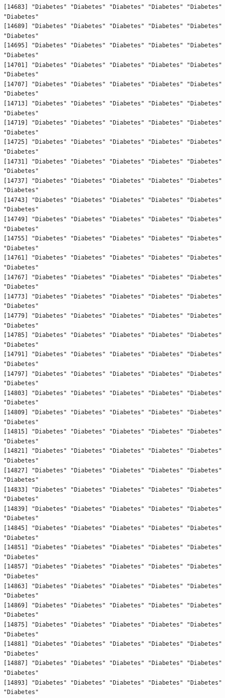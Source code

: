 \documentclass[
  letterpaper,
  DIV=11,
  numbers=noendperiod]{scrartcl}
\begin{document}
\begin{verbatim}
[14683] "Diabetes" "Diabetes" "Diabetes" "Diabetes" "Diabetes" "Diabetes"
[14689] "Diabetes" "Diabetes" "Diabetes" "Diabetes" "Diabetes" "Diabetes"
[14695] "Diabetes" "Diabetes" "Diabetes" "Diabetes" "Diabetes" "Diabetes"
[14701] "Diabetes" "Diabetes" "Diabetes" "Diabetes" "Diabetes" "Diabetes"
[14707] "Diabetes" "Diabetes" "Diabetes" "Diabetes" "Diabetes" "Diabetes"
[14713] "Diabetes" "Diabetes" "Diabetes" "Diabetes" "Diabetes" "Diabetes"
[14719] "Diabetes" "Diabetes" "Diabetes" "Diabetes" "Diabetes" "Diabetes"
[14725] "Diabetes" "Diabetes" "Diabetes" "Diabetes" "Diabetes" "Diabetes"
[14731] "Diabetes" "Diabetes" "Diabetes" "Diabetes" "Diabetes" "Diabetes"
[14737] "Diabetes" "Diabetes" "Diabetes" "Diabetes" "Diabetes" "Diabetes"
[14743] "Diabetes" "Diabetes" "Diabetes" "Diabetes" "Diabetes" "Diabetes"
[14749] "Diabetes" "Diabetes" "Diabetes" "Diabetes" "Diabetes" "Diabetes"
[14755] "Diabetes" "Diabetes" "Diabetes" "Diabetes" "Diabetes" "Diabetes"
[14761] "Diabetes" "Diabetes" "Diabetes" "Diabetes" "Diabetes" "Diabetes"
[14767] "Diabetes" "Diabetes" "Diabetes" "Diabetes" "Diabetes" "Diabetes"
[14773] "Diabetes" "Diabetes" "Diabetes" "Diabetes" "Diabetes" "Diabetes"
[14779] "Diabetes" "Diabetes" "Diabetes" "Diabetes" "Diabetes" "Diabetes"
[14785] "Diabetes" "Diabetes" "Diabetes" "Diabetes" "Diabetes" "Diabetes"
[14791] "Diabetes" "Diabetes" "Diabetes" "Diabetes" "Diabetes" "Diabetes"
[14797] "Diabetes" "Diabetes" "Diabetes" "Diabetes" "Diabetes" "Diabetes"
[14803] "Diabetes" "Diabetes" "Diabetes" "Diabetes" "Diabetes" "Diabetes"
[14809] "Diabetes" "Diabetes" "Diabetes" "Diabetes" "Diabetes" "Diabetes"
[14815] "Diabetes" "Diabetes" "Diabetes" "Diabetes" "Diabetes" "Diabetes"
[14821] "Diabetes" "Diabetes" "Diabetes" "Diabetes" "Diabetes" "Diabetes"
[14827] "Diabetes" "Diabetes" "Diabetes" "Diabetes" "Diabetes" "Diabetes"
[14833] "Diabetes" "Diabetes" "Diabetes" "Diabetes" "Diabetes" "Diabetes"
[14839] "Diabetes" "Diabetes" "Diabetes" "Diabetes" "Diabetes" "Diabetes"
[14845] "Diabetes" "Diabetes" "Diabetes" "Diabetes" "Diabetes" "Diabetes"
[14851] "Diabetes" "Diabetes" "Diabetes" "Diabetes" "Diabetes" "Diabetes"
[14857] "Diabetes" "Diabetes" "Diabetes" "Diabetes" "Diabetes" "Diabetes"
[14863] "Diabetes" "Diabetes" "Diabetes" "Diabetes" "Diabetes" "Diabetes"
[14869] "Diabetes" "Diabetes" "Diabetes" "Diabetes" "Diabetes" "Diabetes"
[14875] "Diabetes" "Diabetes" "Diabetes" "Diabetes" "Diabetes" "Diabetes"
[14881] "Diabetes" "Diabetes" "Diabetes" "Diabetes" "Diabetes" "Diabetes"
[14887] "Diabetes" "Diabetes" "Diabetes" "Diabetes" "Diabetes" "Diabetes"
[14893] "Diabetes" "Diabetes" "Diabetes" "Diabetes" "Diabetes" "Diabetes"

\end{verbatim}
\end{document}
